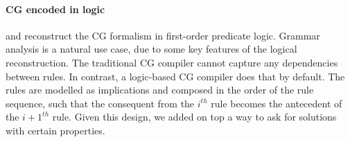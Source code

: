 \paragraph{CG encoded in logic}

 and  reconstruct the CG formalism in first-order predicate logic.
Grammar analysis is a natural use case, due to some key features of the logical reconstruction.
The traditional CG compiler 
 cannot capture any dependencies between rules.
In contrast, a logic-based CG compiler does that by default. 
The rules are modelled as implications and composed in the order of the rule sequence, such that 
the consequent from the $i^{th}$ rule becomes the antecedent of the $i+1^{th}$ rule.
Given this design, we added on top a way to ask for solutions with certain properties.













